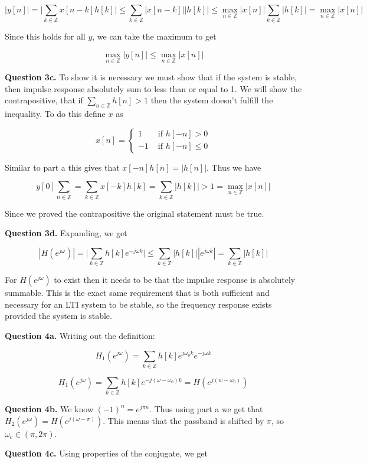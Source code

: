 \documentclass[letterpaper, reqno,11pt]{article}
\newcommand{\ZZ}{\mathbb{Z}}
\begin{document}
$$
    |y[n]|=\bigg|\sum_{k\in\ZZ} x[n-k]h[k]\bigg|\leq \sum_{k\in\ZZ}|x[n-k]||h[k]|\leq \max_{n\in\ZZ}|x[n]|\sum_{k\in\ZZ}|h[k]|=\max_{n\in\ZZ}|x[n]|
$$

Since this holds for all $y$, we can take the maximum to get 

$$
    \max_{n\in\ZZ}|y[n]|\leq\max_{n\in\ZZ}|x[n]|
$$

{\noindent\bf Question 3c.} To show it is necessary we must show that if the system is stable, then impulse response absolutely sum to less than or equal to 1. We will show the contrapositive, that if $\sum_{n\in\ZZ} h[n]>1$ then the system doesn't fulfill the inequality. To do this define $x$ as 

$$
    x[n] = \begin{cases}1&\text{ if }h[-n]>0\\-1&\text{ if } h[-n] \leq 0\end{cases}
$$

Similar to part a this gives that $x[-n]h[n]=|h[n]|$. Thus we have 

$$
    y[0]\sum_{n\in\ZZ}=\sum_{k\in\ZZ}x[-k]h[k]=\sum_{k\in\ZZ}|h[k]|>1=\max_{n\in\ZZ}|x[n]|
$$

Since we proved the contrapositive the original statement must be true. 

{\noindent\bf Question 3d.} Expanding, we get 

$$
    |H(e^{j\omega})|=\bigg|\sum_{k\in\ZZ}h[k]e^{-j\omega k}\bigg|\leq \sum_{k\in\ZZ}|h[k]||e^{j\omega k}|=\sum_{k\in\ZZ}|h[k]|
$$

For $H(e^{j\omega})$ to exist then it needs to be that the impulse response is absolutely summable. This is the exact same requirement that is both sufficient and necessary for an LTI system to be stable, so the frequency response exists provided the system is stable. 

{\noindent\bf Question 4a.} Writing out the definition: 

$$
    H_1(e^{j\omega})=\sum_{k\in\ZZ}h[k]e^{j\omega_0 k}e^{-j\omega k}
$$

$$
    H_1(e^{j\omega})=\sum_{k\in\ZZ}h[k]e^{-j(\omega-\omega_0) k}=H(e^{j(w-\omega_0)})
$$

{\noindent\bf Question 4b.} We know $(-1)^n=e^{j\pi n}$. Thus using part a we get that $H_2(e^{j\omega}) = H(e^{j(\omega-\pi)})$. This means that the passband is shifted by $\pi$, so $\omega_c\in(\pi, 2\pi)$. 

{\noindent\bf Question 4c.} Using properties of the conjugate, we get 
\end{document}
